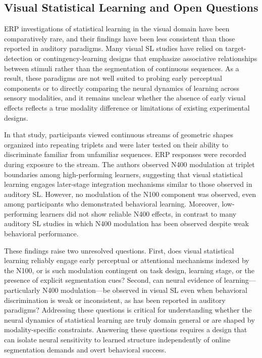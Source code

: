 \subsection*{Visual Statistical Learning and Open Questions}

ERP investigations of statistical learning in the visual domain have been comparatively rare, and their findings have been less consistent than those reported in auditory paradigms. Many visual SL studies have relied on target-detection or contingency-learning designs that emphasize associative relationships between stimuli rather than the segmentation of continuous sequences. As a result, these paradigms are not well suited to probing early perceptual components or to directly comparing the neural dynamics of learning across sensory modalities, and it remains unclear whether the absence of early visual effects reflects a true modality difference or limitations of existing experimental designs.

In that study, participants viewed continuous streams of geometric shapes organized into repeating triplets and were later tested on their ability to discriminate familiar from unfamiliar sequences. ERP responses were recorded during exposure to the stream. The authors observed N400 modulation at triplet boundaries among high-performing learners, suggesting that visual statistical learning engages later-stage integration mechanisms similar to those observed in auditory SL. However, no modulation of the N100 component was observed, even among participants who demonstrated behavioral learning. Moreover, low-performing learners did not show reliable N400 effects, in contrast to many auditory SL studies in which N400 modulation has been observed despite weak behavioral performance.

These findings raise two unresolved questions. First, does visual statistical learning reliably engage early perceptual or attentional mechanisms indexed by the N100, or is such modulation contingent on task design, learning stage, or the presence of explicit segmentation cues? Second, can neural evidence of learning---particularly N400 modulation---be observed in visual SL even when behavioral discrimination is weak or inconsistent, as has been reported in auditory paradigms? Addressing these questions is critical for understanding whether the neural dynamics of statistical learning are truly domain general or are shaped by modality-specific constraints. Answering these questions requires a design that can isolate neural sensitivity to learned structure independently of online segmentation demands and overt behavioral success.

